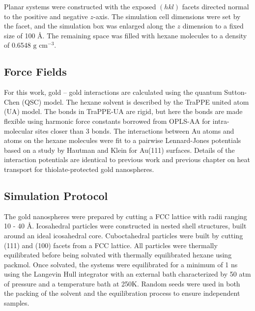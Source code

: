 Planar systems were constructed with the exposed $(hkl)$ facets
directed normal to the positive and negative $z$-axis.  The simulation
cell dimensions were set by the facet, and the simulation box was
enlarged along the $z$ dimension to a fixed size of 100 \AA.  The
remaining space was filled with hexane molecules to a density of
0.6548 $\text{g cm}^{-3}$.


\subsection{Force Fields}

For this work, gold -- gold interactions are calculated using the
quantum Sutton-Chen (QSC) model.\cite{Qi:1999ph} The hexane solvent is
described by the TraPPE united atom (UA)
model.\cite{TraPPE-UA.alkanes} The bonds in TraPPE-UA are rigid, but
here the bonds are made flexible using harmonic force constants
borrowed from OPLS-AA for intra-molecular sites closer than 3
bonds.\cite{Jorgensen98a} The interactions between Au atoms and atoms
on the hexane molecules were fit to a pairwise Lennard-Jones
potentials based on a study by Hautman and Klein for Au(111)
surfaces.\cite{hautman:4994} Details of the interaction potentials are
identical to previous work and previous chapter on heat 
transport for thiolate-protected gold nanospheres.\cite{Stocker2016}

\subsection{Simulation Protocol}
The gold nanospheres were prepared by cutting a FCC lattice with radii ranging
10 - 40 \AA. 
Icosahedral particles were
constructed in nested shell structures, built around an ideal
icosahedral core.  Cuboctahedral particles were built by cutting (111)
and (100) facets from a FCC lattice.
All particles were thermally equilibrated before being
solvated with thermally equilibrated hexane using packmol.\cite{packmol}
Once solvated, the systems were equilibrated for a minimum of 1 ns 
using the Langevin Hull 
integrator with an external bath characterized by 50 atm of
pressure and a temperature bath at 250K.\cite{Vardeman2011}
Random seeds were used in both the packing of the solvent and the equilibration process to ensure independent samples.

